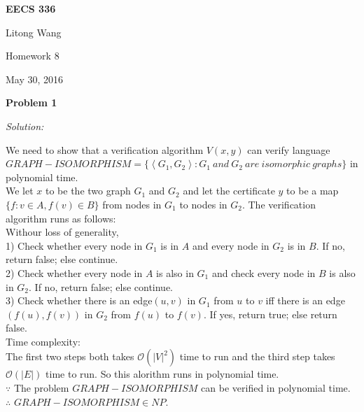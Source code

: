 \documentclass[12pt,letterpaper]{article}
\def\pp{\par\noindent}
\newcommand{\problem}[1]{ \bigskip \pp \textbf{Problem #1}\par}
\newcommand{\solution}{\textit{Solution:}\par}
\begin{document}
\centerline{\bf EECS 336}

\medskip
\centerline{Litong Wang}
\centerline{Homework 8}
\centerline{May 30, 2016}
\bigskip


\problem{1}
\solution
We need to show that a verification algorithm $V(x,y)$ can verify
language $GRAPH-ISOMORPHISM = \{ \left \langle G_1, G_2 \right \rangle : G_1\ and\ G_2\ are\ isomorphic\ graphs\}$
in polynomial time. \\
We let $x$ to be the two graph $G_1$ and $G_2$ and let the certificate $y$ to be a map $\{ f: v \in A, f(v) \in B \}$ from nodes in $G_1$ to nodes in $G_2$.
The verification algorithm runs as follows: \\
Withour loss of generality, \\
1) Check whether every node in $G_1$ is in $A$ and every node in $G_2$ is in $B$. If no, return false; else continue. \\
2) Check whether every node in $A$ is also in $G_1$ and check every node in $B$ is also in $G_2$. If no, return false; else continue. \\
3) Check whether there is an edge$(u,v)$ in $G_1$ from $u$ to $v$ iff there is an edge$(f(u),f(v))$ in $G_2$ from $f(u)$ to $f(v)$. If yes, return true; else return false. \\
Time complexity: \\
The first two steps both takes $\mathcal{O}(|V|^2)$ time to run and the third step takes $\mathcal{O}(|E|)$ time to run.
So this alorithm runs in polynomial time. \\
$\because$ The problem $GRAPH-ISOMORPHISM$ can be verified in polynomial time. \\
$\therefore$ $GRAPH-ISOMORPHISM \in NP$.
\end{document}
